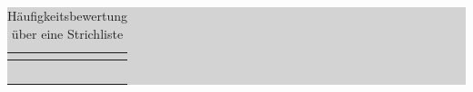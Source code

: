 \begin{table}[H]
\caption{H\"{a}ufigkeitsbewertung \"{u}ber eine Strichliste }
\setlength{\fboxsep}{0pt}%
\colorbox{lightgray}{%
%
\begin{tabular}{| c | c | c | c |}
\hline
\parbox[c][0.28in][c]{1in}{\smallskip\centering\textbf{}} & 
\parbox[c][0.28in][c]{2.1in}{\smallskip\centering\textbf{}} &
\parbox[c][0.28in][c]{1in}{\smallskip\centering\textbf{}} &
\parbox[c][0.28in][c]{2.1in}{\smallskip\centering\textbf{}}\\ \hline

\parbox[c][0.28in][c]{1in}{\centering{}\selectfont{983}} &
\parbox[c][0.28in][c]{2.1in}{} &
\parbox[c][0.28in][c]{1in}{\centering{}\selectfont{988}} &
\parbox[c][0.28in][c]{2.1in}{} \\ \hline

\parbox[c][0.28in][c]{1in}{\centering{}\selectfont{984}} &
\parbox[c][0.28in][c]{2.1in}{} &
\parbox[c][0.28in][c]{1in}{\centering{}\selectfont{989}} &
\parbox[c][0.28in][c]{2.1in}{} \\ \hline

\parbox[c][0.28in][c]{1in}{\centering{}\selectfont{985}} &
\parbox[c][0.28in][c]{2.1in}{} &
\parbox[c][0.28in][c]{1in}{\centering{}\selectfont{990}} &
\parbox[c][0.28in][c]{2.1in}{} \\ \hline

\parbox[c][0.28in][c]{1in}{\centering{}\selectfont{986}} &
\parbox[c][0.28in][c]{2.1in}{} &
\parbox[c][0.28in][c]{1in}{\centering{}\selectfont{991}} &
\parbox[c][0.28in][c]{2.1in}{} \\ \hline

\parbox[c][0.28in][c]{1in}{\centering{}\selectfont{987}} &
\parbox[c][0.28in][c]{2.1in}{} &
\parbox[c][0.28in][c]{1in}{\centering{}\selectfont{992}} &
\parbox[c][0.28in][c]{2.1in}{} \\ \hline

\end{tabular}%
}\bigskip
\label{tab:threetwo}
\end{table}

